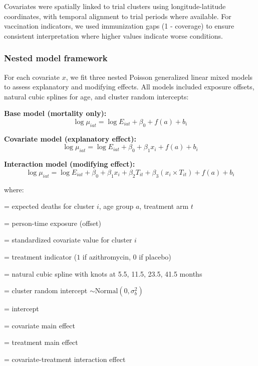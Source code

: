 \documentclass[11pt]{article}\usepackage[]{graphicx}\usepackage[]{xcolor}
\begin{document}
Covariates were spatially linked to trial clusters using longitude-latitude coordinates, with temporal alignment to trial periods where available. For vaccination indicators, we used immunization gaps (1 - coverage) to ensure consistent interpretation where higher values indicate worse conditions.

\subsubsection{Nested model framework}

For each covariate $x$, we fit three nested Poisson generalized linear mixed models to assess explanatory and modifying effects. All models included exposure offsets, natural cubic splines for age, and cluster random intercepts:

\textbf{Base model (mortality only):}
\begin{equation}
\log \mu_{iat} = \log E_{iat} + \beta_0 + f(a) + b_i
\end{equation}

\textbf{Covariate model (explanatory effect):}
\begin{equation}
\log \mu_{iat} = \log E_{iat} + \beta_0 + \beta_1 x_i + f(a) + b_i
\end{equation}

\textbf{Interaction model (modifying effect):}
\begin{equation}
\log \mu_{iat} = \log E_{iat} + \beta_0 + \beta_1 x_i + \beta_2 T_{it} + \beta_3 (x_i \times T_{it}) + f(a) + b_i
\end{equation}

\noindent where:
\begin{description}[leftmargin=2em]
\item[$\mu_{iat}$] = expected deaths for cluster $i$, age group $a$, treatment arm $t$
\item[$E_{iat}$] = person-time exposure (offset)
\item[$x_i$] = standardized covariate value for cluster $i$
\item[$T_{it}$] = treatment indicator ($1$ if azithromycin, $0$ if placebo)
\item[$f(a)$] = natural cubic spline with knots at 5.5, 11.5, 23.5, 41.5 months
\item[$b_i$] = cluster random intercept $\sim \text{Normal}(0, \sigma_b^2)$
\item[$\beta_0$] = intercept
\item[$\beta_1$] = covariate main effect
\item[$\beta_2$] = treatment main effect  
\item[$\beta_3$] = covariate-treatment interaction effect
\end{description}
\end{document}
